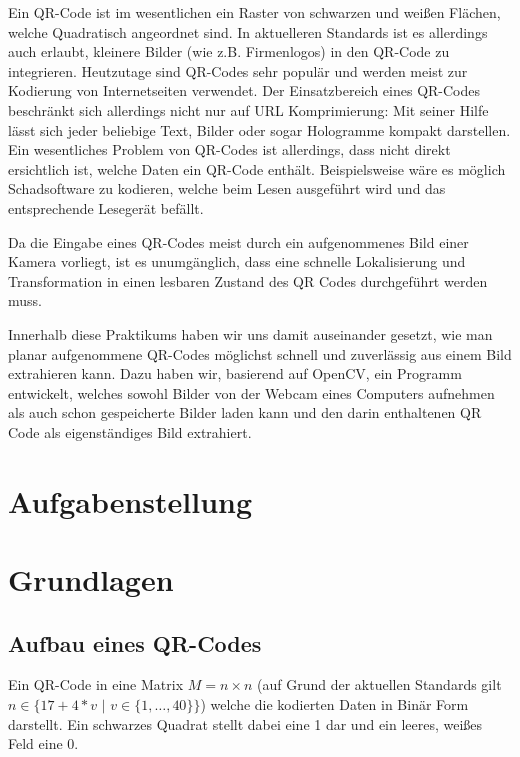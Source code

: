 \documentclass[a4paper, oneside, 12pt]{article}
\begin{document}
Ein QR-Code ist im wesentlichen ein Raster von schwarzen und weißen Flächen, welche Quadratisch angeordnet sind. In aktuelleren Standards ist es allerdings auch erlaubt, kleinere Bilder (wie z.B. Firmenlogos) in den QR-Code zu integrieren. Heutzutage sind QR-Codes sehr populär und werden meist zur Kodierung von Internetseiten verwendet. Der Einsatzbereich eines QR-Codes beschränkt sich allerdings nicht nur auf URL Komprimierung: Mit seiner Hilfe lässt sich jeder beliebige Text, Bilder oder sogar Hologramme kompakt darstellen. Ein wesentliches Problem von QR-Codes ist allerdings, dass nicht direkt ersichtlich ist, welche Daten ein QR-Code enthält. Beispielsweise wäre es möglich Schadsoftware zu kodieren, welche beim Lesen ausgeführt wird und das entsprechende Lesegerät befällt.

Da die Eingabe eines QR-Codes meist durch ein aufgenommenes Bild einer Kamera vorliegt, ist es unumgänglich, dass eine schnelle Lokalisierung und Transformation in einen lesbaren Zustand des QR Codes durchgeführt werden muss.

Innerhalb diese Praktikums haben wir uns damit auseinander gesetzt, wie man planar aufgenommene QR-Codes möglichst schnell und zuverlässig aus einem Bild extrahieren kann. Dazu haben wir, basierend auf OpenCV, ein Programm entwickelt, welches sowohl Bilder von der Webcam eines Computers aufnehmen als auch schon gespeicherte Bilder laden kann und den  darin enthaltenen QR Code als eigenständiges Bild extrahiert.

\section{Aufgabenstellung}
\label{s:aufgabenstellung}

\newpage

\section{Grundlagen}
\label{s:grundlagen}

\subsection{Aufbau eines QR-Codes}
\label{ss:aufbau}

Ein QR-Code in eine Matrix $M = n \times n$ \Big(auf Grund der aktuellen Standards gilt $n \in \big\{17+4*v \,\, | \,\, v \in  \{1,\dots, 40\}\big\}$\Big) welche die kodierten Daten in Binär Form darstellt. Ein schwarzes Quadrat stellt dabei eine 1 dar und ein leeres, weißes Feld eine 0.
\end{document}
